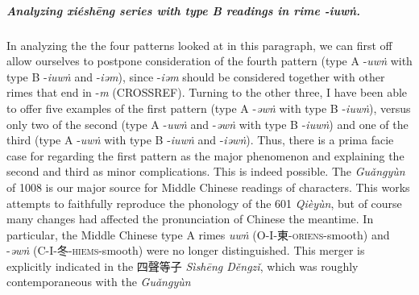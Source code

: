 \subparagraph{Analyzing \textit{xiéshēng} series with type B readings in rime -\textit{iuwṅ}.}
In analyzing the the four patterns looked at in this paragraph, we can first off allow ourselves to postpone consideration of the fourth pattern (type A -\textit{uwṅ} with type B -\textit{iuwṅ} and -\textit{iəm}), since -\textit{iəm} should be considered together with other rimes that end in -\textit{m} (CROSSREF). Turning to the other three, I have been able to offer five examples of the first pattern (type A -\textit{əwṅ} with type B -\textit{iuwṅ}), versus only two of the second (type A -\textit{uwṅ} and -\textit{əwṅ} with type B -\textit{iuwṅ}) and one of the third (type A -\textit{uwṅ} with type B -\textit{iuwṅ} and
-\textit{iəwṅ}).  Thus, there is a prima facie case for regarding the first pattern as the major phenomenon and explaining the second and third as minor complications. This is indeed possible.  
The \textit{Guǎngyùn} of 1008 is our major source for Middle Chinese readings of characters. This works attempts to faithfully reproduce the phonology of the 601 \textit{Qièyùn}, but of course many changes had affected the pronunciation of Chinese the meantime. In particular, the Middle Chinese type A rimes 
\textit{uwṅ} (O-I-東-\textsc{oriens}-smooth) and -\textit{əwṅ}  (C-I-冬-\textsc{hiems}-smooth) were no longer distinguished. This merger is explicitly indicated in the 四聲等子 \textit{Sìshēng Děngzǐ}, which was roughly contemporaneous with the \textit{Guǎngyùn}  
\citep[pp. 183 and 185]{shen2020phonological}




